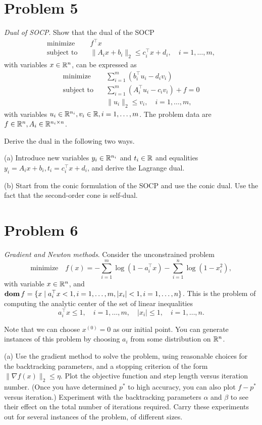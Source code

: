 \documentclass[11pt]{article}
\newcommand{\grad}{\nabla}
\newcommand{\T}{^\top}          %
\begin{document}
\section*{Problem 5}
\textit{Dual of SOCP}. Show that the dual of the SOCP
\begin{align*}
  \text{minimize} \quad & f\T x\\
  \text{subject to} \quad & \|A_i x + b_i\|_2 \leq c_i\T x + d_i, \quad i = 1, \dots, m,
\end{align*}
with variables $x\in{{\mathbb{R}}}^n$, can be expressed as 
\begin{align*}
  \text{minimize} \quad & \sum_{i=1}^{m} (b_i\T u_i - d_i v_i)\\
  \text{subject to} \quad & \sum_{i=1}^{m} (A_i\T u_i - c_i v_i) + f = 0\\
  & \|u_i\|_2 \leq v_i, \quad i = 1, \dots, m,
\end{align*}
with variables $u_i\in{{\mathbb{R}}}^{n_i}, v_i\in{{\mathbb{R}}}, i = 1, \dots, m$. The problem data are $f\in{{\mathbb{R}}}^n, A_i\in{{\mathbb{R}}}^{n_i\times n}$.

Derive the dual in the following two ways.

(a) Introduce new variables $y_i\in{{\mathbb{R}}}^{n_i}$ and $t_i \in {{\mathbb{R}}}$ and equalities $y_i = A_i x + b_i, t_i = c_i\T x + d_i$, and derive the Lagrange dual.

(b) Start from the conic formulation of the SOCP and use the conic dual. Use the fact that the second-order cone is self-dual.



\clearpage
\section*{Problem 6}
\textit{Gradient and Newton methods}. Consider the unconstrained problem
\[
\text{minimize} \quad f(x) = -\sum_{i=1}^{m}\log(1 - a_i\T x) - \sum_{i=1}^{n} \log(1 - x^2_i),
\]
with variable $x\in{{\mathbb{R}}}^n$, and $\dom f=\{x \mid a_i\T x < 1, i = 1, \dots, m, |x_i| < 1, i = 1, \dots, n\}$.
This is the problem of computing the analytic center of the set of linear inequalities
\[
a_i\T x \leq 1, \quad i=1, \dots, m, \quad |x_i| \leq 1, \quad i = 1, \dots, n.
\]

Note that we can choose $x^{(0)} = 0$ as our initial point. You can generate instances of this problem by choosing $a_i$ from some distribution on ${{\mathbb{R}}}^n$.

(a) Use the gradient method to solve the problem, using reasonable choices for the backtracking parameters, and a stopping criterion of the form $\|\grad f(x) \|_2 \leq \eta$. Plot the objective function and step length versus iteration number. (Once you have determined $p^*$ to high accuracy, you can also plot $f - p^*$ versus iteration.) Experiment with the backtracking parameters $\alpha$ and $\beta$ to see their effect on the total number of iterations required. Carry these experiments out for several instances of the problem, of different sizes.
\end{document}
